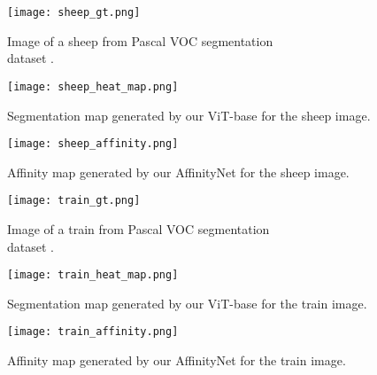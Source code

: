 \begin{figure}[H]
  \texttt{[image: sheep\_gt.png]}
  \caption{Image of a sheep from Pascal VOC segmentation \\dataset \cite{ahn2018learning}.}
  \label{fig:sheep_gt}
\endminipage\hfill
{}
  \texttt{[image: sheep\_heat\_map.png]}
  \caption{Segmentation map generated by our ViT-base for the sheep image.}
  \label{fig:sheep_heat_map}
\endminipage\hfill
{}%
  \texttt{[image: sheep\_affinity.png]}
  \caption{Affinity map generated by our AffinityNet for the sheep image.}
  \label{fig:sheep_aff}
\endminipage
\end{figure}

\begin{figure}[H]
  \texttt{[image: train\_gt.png]}
  \caption{Image of a train from Pascal VOC segmentation \\dataset \cite{ahn2018learning}.}
  \label{fig:train_gt}
\endminipage\hfill
{}
  \texttt{[image: train\_heat\_map.png]}
  \caption{Segmentation map generated by our ViT-base for the train image.}
  \label{fig:train_heat_map}
\endminipage\hfill
{}%
  \texttt{[image: train\_affinity.png]}
  \caption{Affinity map generated by our AffinityNet for the train image.}
  \label{fig:train_aff}
\endminipage
\end{figure}
